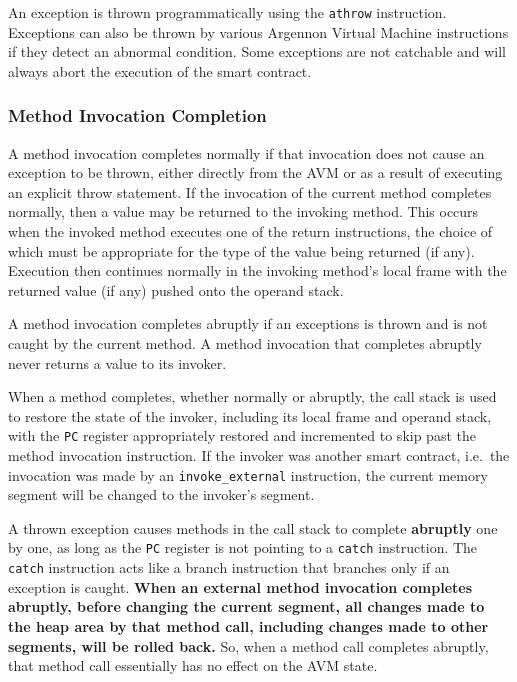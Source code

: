 \documentclass[11pt, A4]{report}
\begin{document}
    An exception is thrown programmatically using the \texttt{athrow} instruction. Exceptions can also be thrown by
    various Argennon Virtual Machine instructions if they detect an abnormal condition. Some exceptions are not
    catchable and will always abort the execution of the smart contract.

    \subsubsection{Method Invocation Completion}

    A method invocation completes normally if that invocation does not cause an exception to be thrown, either
    directly from the AVM or as a result of executing an explicit throw statement. If the invocation of the current
    method completes normally, then a value may be returned to the invoking method. This occurs when the invoked
    method executes one of the return instructions, the choice of which must be appropriate for the type of the value
    being returned (if any). Execution then continues normally in the invoking method's local frame with the returned
    value (if any) pushed onto the operand stack.

    A method invocation completes abruptly if an exceptions is thrown and is not caught by the current method. A
    method invocation that completes abruptly never returns a value to its invoker.

    When a method completes, whether normally or abruptly, the call stack is used to restore the state of the invoker,
    including its local frame and operand stack, with the \texttt{PC} register appropriately restored and incremented
    to skip past the method invocation instruction. If the invoker was another smart contract, i.e.\ the invocation
    was made by an \texttt{invoke\_external} instruction, the current memory segment will be changed to the invoker's
    segment.

    A thrown exception causes methods in the call stack to complete \textbf{abruptly} one by one, as long as the
    \texttt{PC} register is not pointing to a \texttt{catch} instruction. The \texttt{catch} instruction acts like a
    branch instruction that branches only if an exception is caught. \textbf{When an external method invocation
    completes abruptly, before changing the current segment, all changes made to the heap area by that method
    call, including changes made to other segments, will be rolled back.} So, when a method call completes abruptly,
    that method call essentially has no effect on the AVM state.
\end{document}

